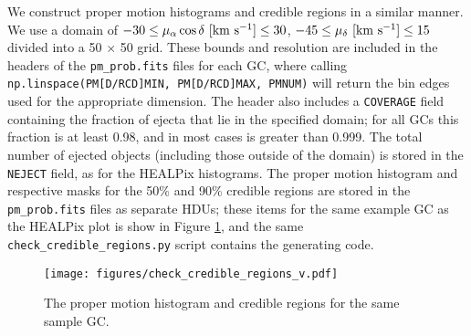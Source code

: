 \documentclass[twocolumn]{aastex631}
\begin{document}
We construct proper motion histograms and credible regions in a similar manner.
We use a domain of $-30 \le \mu_\alpha \cos \delta~{\rm [km~s^{-1}]} \le 30$, $-45 \le \mu_\delta~{\rm [km~s^{-1}]} \le 15$ divided into a 50 $\times$ 50 grid.
These bounds and resolution are included in the headers of the \texttt{pm\_prob.fits} files for each GC, where calling \texttt{np.linspace(PM[D/RCD]MIN, PM[D/RCD]MAX, PMNUM)} will return the bin edges used for the appropriate dimension.
The header also includes a \texttt{COVERAGE} field containing the fraction of ejecta that lie in the specified domain; for all GCs this fraction is at least 0.98, and in most cases is greater than 0.999.
The total number of ejected objects (including those outside of the domain) is stored in the \texttt{NEJECT} field, as for the HEALPix histograms.
The proper motion histogram and respective masks for the 50\% and 90\% credible regions are stored in the \texttt{pm\_prob.fits} files as separate HDUs; these items for the same example GC as the HEALPix plot is show in Figure \ref{fig:check_credible_regions_v}, and the same \texttt{check\_credible\_regions.py} script contains the generating code.

\begin{figure}
    \centering
    \texttt{[image: figures/check\_credible\_regions\_v.pdf]}
    \caption{
        The proper motion histogram and credible regions for the same sample GC.
    }
    \label{fig:check_credible_regions_v}
\end{figure}


\end{document}
